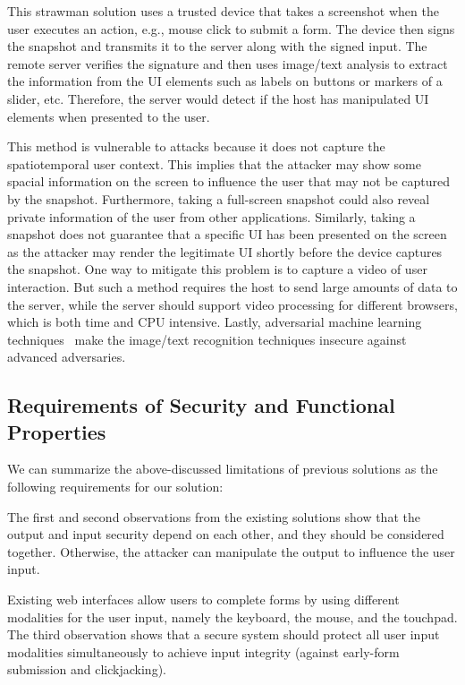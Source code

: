  This strawman solution uses a trusted device that takes a screenshot when the user executes an action, e.g., mouse click to submit a form. The device then signs the snapshot and transmits it to the server along with the signed input. The remote server verifies the signature and then uses image/text analysis to extract the information from the UI elements such as labels on buttons or markers of a slider, etc. Therefore, the server would detect if the host has manipulated UI elements when presented to the user.

This method is vulnerable to attacks because it does not capture the spatiotemporal user context. This implies that the attacker may show some spacial information on the screen to influence the user that may not be captured by the snapshot. Furthermore, taking a full-screen snapshot could also reveal private information of the user from other applications. Similarly, taking a snapshot does not guarantee that a specific UI has been presented on the screen as the attacker may render the legitimate UI shortly before the device captures the snapshot.
One way to mitigate this problem is to capture a video of user interaction. But such a method requires the host to send large amounts of data to the server, while the server should support video processing for different browsers, which is both time and CPU intensive. Lastly, adversarial machine learning techniques~\cite{eykholt2017robust,sitawarin2018rogue} make the image/text recognition techniques insecure against advanced adversaries.


\subsection{Requirements of Security and Functional Properties}
\label{sec:problemStatement:goals}

We can summarize the above-discussed limitations of previous solutions as the following requirements for our solution:

The first and second observations from the existing solutions show that the output and input security depend on each other, and they should be considered together. Otherwise, the attacker can manipulate the output to influence the user input.

Existing web interfaces allow users to complete forms by using different modalities for the user input, namely the keyboard, the mouse, and the touchpad. The third observation shows that a secure system should protect all user input modalities simultaneously to achieve input integrity (against early-form submission and clickjacking).


